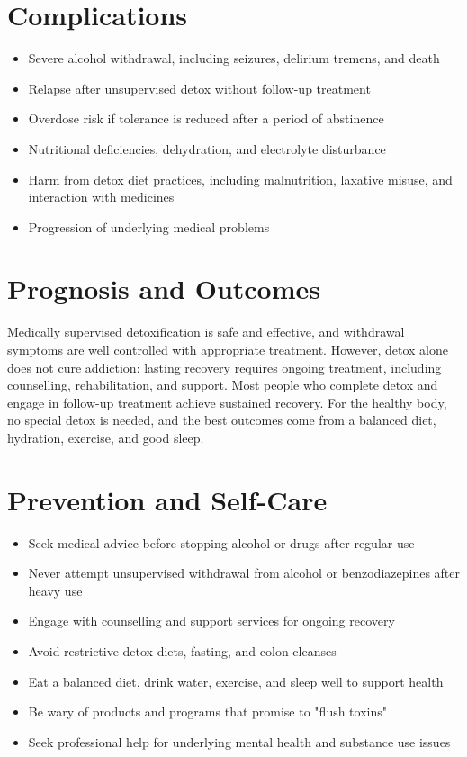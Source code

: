 \section*{Complications}
\begin{itemize}
    \item Severe alcohol withdrawal, including seizures, delirium tremens, and death
    \item Relapse after unsupervised detox without follow-up treatment
    \item Overdose risk if tolerance is reduced after a period of abstinence
    \item Nutritional deficiencies, dehydration, and electrolyte disturbance
    \item Harm from detox diet practices, including malnutrition, laxative misuse, and interaction with medicines
    \item Progression of underlying medical problems
\end{itemize}

\section*{Prognosis and Outcomes}
Medically supervised detoxification is safe and effective, and withdrawal symptoms are well controlled with appropriate treatment. However, detox alone does not cure addiction: lasting recovery requires ongoing treatment, including counselling, rehabilitation, and support. Most people who complete detox and engage in follow-up treatment achieve sustained recovery. For the healthy body, no special detox is needed, and the best outcomes come from a balanced diet, hydration, exercise, and good sleep.

\section*{Prevention and Self-Care}
\begin{itemize}
    \item Seek medical advice before stopping alcohol or drugs after regular use
    \item Never attempt unsupervised withdrawal from alcohol or benzodiazepines after heavy use
    \item Engage with counselling and support services for ongoing recovery
    \item Avoid restrictive detox diets, fasting, and colon cleanses
    \item Eat a balanced diet, drink water, exercise, and sleep well to support health
    \item Be wary of products and programs that promise to "flush toxins"
    \item Seek professional help for underlying mental health and substance use issues
\end{itemize}


